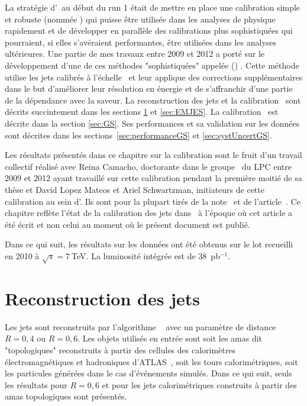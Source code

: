 La stratégie d'\ATLAS~au début du run 1 était de mettre en place une calibration simple et robuste (nommée \EMJES) qui puisse être utilisée dans les analyses de physique rapidement et de développer en parallèle des calibrations plus sophistiquées qui pourraient, si elles s'avéraient performantes, être utilisées dans les analyses ultérieures. Une partie de mes travaux entre 2009 et 2012 a port\'e sur le d\'eveloppement d'une de ces m\'ethodes "sophistiqu\'ees" appel\'ee   (\GS) . Cette m\'ethode utilise les jets calibr\'es \`a l'\'echelle \EMJES~et leur applique des corrections suppl\'ementaires dans le but d'am\'eliorer leur r\'esolution en \'energie et de s'affranchir d'une partie de la d\'ependance avec la saveur. La reconstruction des jets et la calibration \EMJES~sont d\'ecrits succintement dans les sections \ref{sec:jetReco} et \ref{sec:EMJES}. La calibration \GS~est d\'ecrite dans la section \ref{sec:GS}. Ses performances et sa validation sur les donn\'ees sont d\'ecrites dans les sections~\ref{sec:performanceGS} et \ref{sec:systUncertGS}.

Les résultats pr\'esent\'es dans ce chapitre sur la calibration \GS{} sont le fruit d'un travail collectif r\'ealis\'e avec Reina Camacho, doctorante dans le groupe \ATLAS~du LPC entre 2009 et 2012 ayant travaill\'e sur cette calibration pendant la premi\`ere moiti\'e de sa th\`ese \cite{camacho:tel-00747143} et David Lopez Mateos et Ariel Schwartzman, initiateurs de cette calibration au sein d'\ATLAS. Ils sont pour la plupart tir\'es de la note~\cite{Busato:1365519} et de l'article~\cite{Aad:2011he}. Ce chapitre refl\`ete l'\'etat de la calibration des jets dans \ATLAS~\`a l'\'epoque o\`u cet article a \'et\'e \'ecrit et non celui au moment o\`u le pr\'esent document est publi\'e.

Dans ce qui suit, les résultats sur les données ont été obtenus sur le lot recueilli en 2010 à $\sqrt{s}=7~$TeV. La luminosité intégrée est de $38$~pb$^{-1}$. 

\section{Reconstruction des jets}
\label{sec:jetReco}

Les jets sont reconstruits par l'algorithme \antikt~\cite{Cacciari:2008gp} avec un param\`etre de distance $R=0,4$ ou $R=0,6$. Les objets utilis\'es en entr\'ee sont soit les amas dit "topologiques" reconstruits \`a partir des cellules des calorim\`etres \'electromagn\'etiques et hadroniques d'ATLAS~\cite{1748-0221-3-08-S08003}, soit les tours calorim\'etriques, soit les particules g\'en\'er\'ees dans le cas d'\'ev\'enements simul\'es. Dans ce qui suit, seuls les r\'esultats pour $R=0,6$ et pour les jets calorim\'etriques construits \`a partir des amas topologiques sont pr\'esent\'es. 

